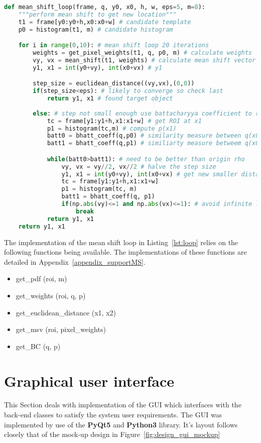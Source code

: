 \begin{lstlisting}[language=Python, caption={Mean shift loop}, captionpos=b, label={lst:loop}]
def mean_shift_loop(frame, q, y0, x0, h, w, eps=5, m=8):
    """perform mean shift to get new location"""
    t1 = frame[y0:y0+h,x0:x0+w] # candidate template
    p0 = histogram(t1, m) # candidate histogram

    for i in range(0,10): # mean shift loop 20 iterations
        weights = get_pixel_weights(t1, q, p0, m) # calculate weights
        vy, vx = mean_shift(t1, weights) # calculate mean shift vector
        y1, x1 = int(y0+vy), int(x0+vx) # y1

        step_size = euclidean_distance((vy,vx),(0,0))
        if(step_size<eps): # likely to converge so check last
            return y1, x1 # found target object
            
        else: # step not small enough use battacharyya coefficient to refine step
            tc = frame[y1:y1+h,x1:x1+w] # get ROI at x1
            p1 = histogram(tc,m) # compute p(x1)
            batt0 = bhatt_coeff(q,p0) # similarity measure between q(x0) and p(x0) 
            batt1 = bhatt_coeff(q,p1) # similiarty measure betweem q(x0) and p(x1)

            while(batt0>batt1): # need to be better than origin rho
                vy, vx = vy//2, vx//2 # halve the step size
                y1, x1 = int(y0+vy), int(x0+vx) # get new smaller distance 
                tc = frame[y1:y1+h,x1:x1+w]
                p1 = histogram(tc, m)
                batt1 = bhatt_coeff(q, p1)
                if(np.abs(vy)<=1 and np.abs(vx)<=1): # avoid infinite loop
                    break
            return y1, x1
    return y1, x1
\end{lstlisting}

The implementation of the mean shift loop in Listing~\ref{lst:loop} relies on
the following functions being available. The implementations of these functions
are detailed in Appendix~\ref{appendix_supportMS}.
\begin{itemize}
    \item get\_pdf (roi, m)
    \item get\_weights (roi, q, p)
    \item get\_euclidean\_distance (x1, x2)
    \item get\_msv (roi, pixel\_weights)
    \item get\_BC (q, p)
\end{itemize}

\section{Graphical user interface}
This Section deals with implementation of the GUI which interfaces with the
back-end classes to satisfy the system user requirements.  The GUI was
implemented by use of the \textbf{PyQt5} and \textbf{Python3} library. It's
layout follows closely that of the mock-up design in
Figure~\ref{fig:design_gui_mockup}

